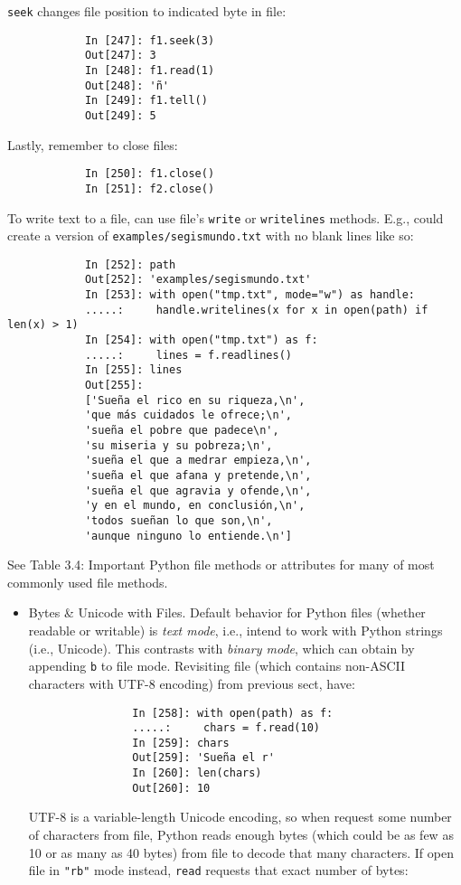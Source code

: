 \documentclass{article}
\begin{document}
\begin{itemize}
\begin{itemize}
		{\tt seek} changes file position to indicated byte in file:
		\begin{verbatim}
			In [247]: f1.seek(3)
			Out[247]: 3
			In [248]: f1.read(1)
			Out[248]: 'ñ'
			In [249]: f1.tell()
			Out[249]: 5
		\end{verbatim}
		Lastly, remember to close files:
		\begin{verbatim}
			In [250]: f1.close()
			In [251]: f2.close()
		\end{verbatim}
		To write text to a file, can use file's {\tt write} or {\tt writelines} methods. E.g., could create a version of {\tt examples/segismundo.txt} with no blank lines like so:
		\begin{verbatim}
			In [252]: path
			Out[252]: 'examples/segismundo.txt'
			In [253]: with open("tmp.txt", mode="w") as handle:
			.....:     handle.writelines(x for x in open(path) if len(x) > 1)
			In [254]: with open("tmp.txt") as f:
			.....:     lines = f.readlines()
			In [255]: lines
			Out[255]:
			['Sueña el rico en su riqueza,\n',
			'que más cuidados le ofrece;\n',
			'sueña el pobre que padece\n',
			'su miseria y su pobreza;\n',
			'sueña el que a medrar empieza,\n',
			'sueña el que afana y pretende,\n',
			'sueña el que agravia y ofende,\n',
			'y en el mundo, en conclusión,\n',
			'todos sueñan lo que son,\n',
			'aunque ninguno lo entiende.\n']
		\end{verbatim}
		See {\sf Table 3.4: Important Python file methods or attributes} for many of most commonly used file methods.
		\begin{itemize}
			\item {\sf Bytes \& Unicode with Files.} Default behavior for Python files (whether readable or writable) is {\it text mode}, i.e., intend to work with Python strings (i.e., Unicode). This contrasts with {\it binary mode}, which can obtain by appending {\tt b} to file mode. Revisiting file (which contains non-ASCII characters with UTF-8 encoding) from previous sect, have:
			\begin{verbatim}
				In [258]: with open(path) as f:
				.....:     chars = f.read(10)
				In [259]: chars
				Out[259]: 'Sueña el r'
				In [260]: len(chars)
				Out[260]: 10
			\end{verbatim}
			UTF-8 is a variable-length Unicode encoding, so when request some number of characters from file, Python reads enough bytes (which could be as few as 10 or as many as 40 bytes) from file to decode that many characters. If open file in {\tt"rb"} mode instead, {\tt read} requests that exact number of bytes:

\end{itemize}
\end{itemize}
\end{itemize}
\end{document}
